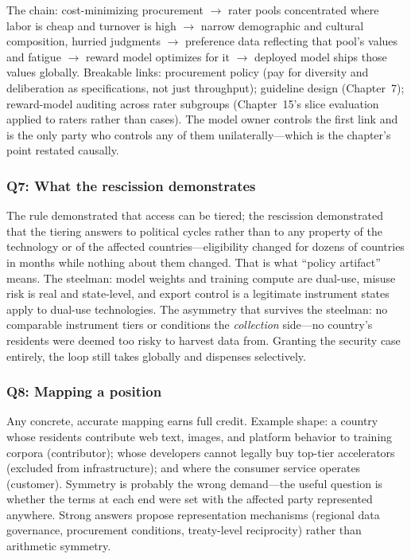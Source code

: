The chain: cost-minimizing procurement $\rightarrow$ rater pools concentrated where labor is cheap and turnover is high $\rightarrow$ narrow demographic and cultural composition, hurried judgments $\rightarrow$ preference data reflecting that pool's values and fatigue $\rightarrow$ reward model optimizes for it $\rightarrow$ deployed model ships those values globally. Breakable links: procurement policy (pay for diversity and deliberation as specifications, not just throughput); guideline design (Chapter~7); reward-model auditing across rater subgroups (Chapter~15's slice evaluation applied to raters rather than cases). The model owner controls the first link and is the only party who controls any of them unilaterally---which is the chapter's point restated causally.

\subsubsection*{Q7: What the rescission demonstrates}

The rule demonstrated that access can be tiered; the rescission demonstrated that the tiering answers to political cycles rather than to any property of the technology or of the affected countries---eligibility changed for dozens of countries in months while nothing about them changed. That is what ``policy artifact'' means. The steelman: model weights and training compute are dual-use, misuse risk is real and state-level, and export control is a legitimate instrument states apply to dual-use technologies. The asymmetry that survives the steelman: no comparable instrument tiers or conditions the \emph{collection} side---no country's residents were deemed too risky to harvest data from. Granting the security case entirely, the loop still takes globally and dispenses selectively.

\subsubsection*{Q8: Mapping a position}

Any concrete, accurate mapping earns full credit. Example shape: a country whose residents contribute web text, images, and platform behavior to training corpora (contributor); whose developers cannot legally buy top-tier accelerators (excluded from infrastructure); and where the consumer service operates (customer). Symmetry is probably the wrong demand---the useful question is whether the terms at each end were set with the affected party represented anywhere. Strong answers propose representation mechanisms (regional data governance, procurement conditions, treaty-level reciprocity) rather than arithmetic symmetry.

